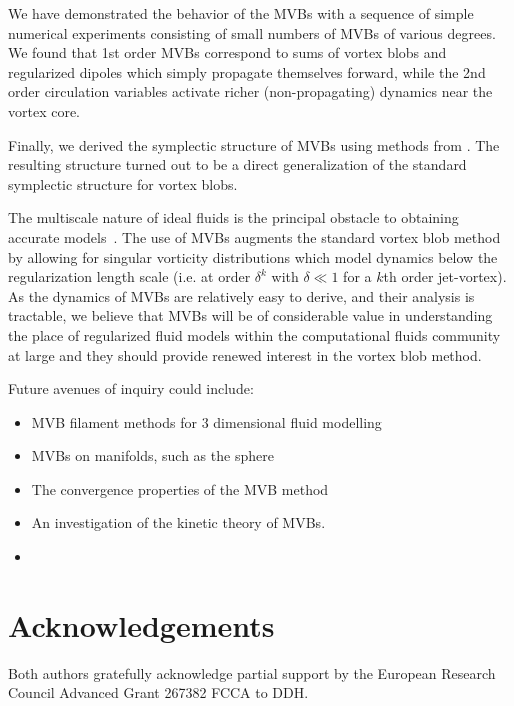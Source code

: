 \documentclass[12pt]{amsart}
\theoremstyle{remark}
\begin{document}
We have demonstrated the behavior of the MVBs with a sequence of simple numerical experiments consisting of small numbers of MVBs of various degrees.
We found that 1st order MVBs correspond to sums of vortex blobs and regularized dipoles which simply propagate themselves forward, while the 2nd order circulation variables activate richer (non-propagating) dynamics near the vortex core.

Finally, we derived the symplectic structure of MVBs using methods from  \cite{MarsdenWeinstein1983}.
The resulting structure turned out to be a direct generalization of the standard
symplectic structure for vortex blobs.

The multiscale nature of ideal fluids is the principal obstacle to obtaining accurate models~\cite[Ch. 3]{Chorin1994}.
The use of MVBs augments the standard vortex blob method by allowing for singular vorticity distributions which model dynamics below the regularization length scale (i.e. at order $\delta^k$ with $\delta\ll1$ for a $k$th order jet-vortex). As the dynamics of MVBs are relatively easy to derive, and their analysis is tractable, we believe that MVBs will be of considerable value in understanding the place of regularized fluid models within the computational fluids community at large
and they should provide renewed interest in the vortex blob method.

Future avenues of inquiry could include:
\begin{itemize}
	\item MVB filament methods for $3$ dimensional fluid modelling
	\item MVBs on manifolds, such as the sphere
	\item The convergence properties of the MVB method
	\item An investigation of the kinetic theory of MVBs.
	\item {}
\end{itemize}

\section{Acknowledgements}
Both authors gratefully acknowledge partial support by the European Research
Council Advanced Grant 267382 FCCA to DDH.
\end{document}
